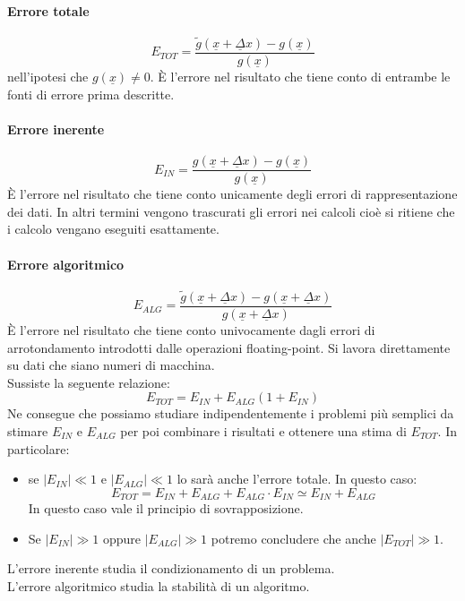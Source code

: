 \documentclass[12pt]{report}
\begin{document}
\paragraph{Errore totale}
\[
E_{TOT} = \frac{\tilde{g}(\underline{x} + \underline{\Delta}x) - g(\underline{x})}{g(\underline{x})}
\]
nell'ipotesi che $g(\underline{x}) \neq 0$.  È l'errore nel risultato che tiene conto di entrambe le fonti di errore prima descritte.
\paragraph{Errore inerente}
\[
E_{IN} = \frac{g(\underline{x} + \underline{\Delta}x) - g(\underline{x})}{g(\underline{x})}
\]
È l'errore nel risultato che tiene conto unicamente degli errori di rappresentazione dei dati. In altri termini vengono trascurati gli errori nei calcoli cioè si ritiene che i calcolo vengano eseguiti esattamente.
\paragraph{Errore algoritmico}
\[
E_{ALG} = \frac{\tilde{g}(\underline{x} + \underline{\Delta}x) - g(\underline{x} + \underline{\Delta}x)}{g(\underline{x} + \underline{\Delta}x)}
\]
È l'errore nel risultato che tiene conto univocamente dagli errori di arrotondamento introdotti dalle operazioni floating-point. Si lavora direttamente su dati che siano numeri di macchina. \\
Sussiste la seguente relazione:
\[
E_{TOT} = E_{IN} + E_{ALG}(1 + E_{IN})
\]
Ne consegue che possiamo studiare indipendentemente i problemi più semplici da stimare $E_{IN}$ e $E_{ALG}$ per poi combinare i risultati e ottenere una stima di $E_{TOT}$. In particolare:
\begin{itemize}
	\item se $|E_{IN}| \ll 1$ e $|E_{ALG}| \ll 1$ lo sarà anche l'errore totale. In questo caso:
	\[
	E_{TOT} = E_{IN} + E_{ALG} + E_{ALG} \cdot E_{IN} \simeq E_{IN} + E_{ALG}
	\]
	In questo caso vale il principio di sovrapposizione.
	\item Se $|E_{IN}| \gg 1$ oppure $|E_{ALG}| \gg 1$ potremo concludere che anche $|E_{TOT}| \gg 1$.
\end{itemize}
L'errore inerente studia il condizionamento di un problema. \\
L'errore algoritmico studia la stabilità di un algoritmo.
\end{document}
